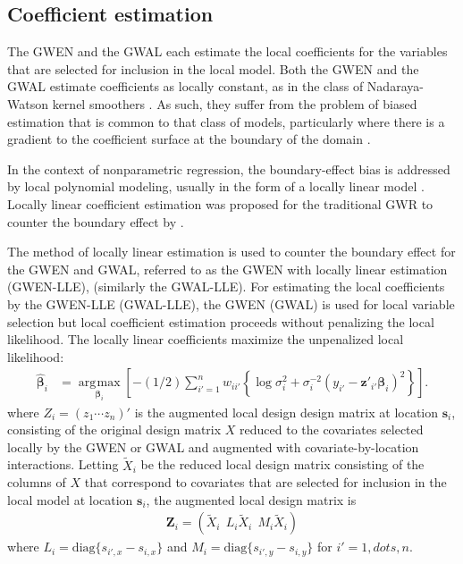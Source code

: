 \documentclass[authoryear, review, 11pt]{elsarticle}
\DeclareMathOperator*{\argmax}{\arg\!\max}
\begin{document}
	\subsection{Coefficient estimation}\label{section:LLE}
	The GWEN and the GWAL each estimate the local coefficients for the variables that are selected for inclusion in the local model. Both the GWEN and the GWAL estimate coefficients as locally constant, as in the class of Nadaraya-Watson kernel smoothers \citep{Hardle-1990}. As such, they suffer from the problem of biased estimation that is common to that class of models, particularly where there is a gradient to the coefficient surface at the boundary of the domain \citep{Hastie:1993b}.

    In the context of nonparametric regression, the boundary-effect bias is addressed by local polynomial modeling, usually in the form of a locally linear model \citep{Fan-1996}. Locally linear coefficient estimation was proposed for the traditional GWR to counter the boundary effect by \cite{Wang:2008b}.

    The method of locally linear estimation is used to counter the boundary effect for the GWEN and GWAL, referred to as the GWEN with locally linear estimation (GWEN-LLE), (similarly the GWAL-LLE). For estimating the local coefficients by the GWEN-LLE (GWAL-LLE), the GWEN (GWAL) is used for local variable selection but local coefficient estimation proceeds without penalizing the local likelihood. The locally linear coefficients maximize the unpenalized local likelihood:
	\begin{align} \label{eq:coefficients}
		\hat{\bm{\beta}}_i &= \argmax \limits_{\bm{\beta}_i} \left[-(1/2) \sum_{i'=1}^n w_{ii'} \left\{ \log{\sigma^2_i}  + \sigma^{-2}_i  \left(y_{i'} - \bm{z}'_{i'} \bm{\beta}_i \right)^2 \right\}\right].
	\end{align}
	where $Z_i  = \left(z_1 \cdots z_n\right)'$ is the augmented local design design matrix at location $\bm{s}_i$, consisting of the original design matrix $X$ reduced to the covariates selected locally by the GWEN or GWAL and augmented with covariate-by-location interactions. Letting $\tilde{X}_i$ be the reduced local design matrix consisting of the columns of $X$ that correspond to covariates that are selected for inclusion in the local model at location $\bm{s}_i$, the augmented local design matrix is
	\begin{align}
		\bm{Z}_i = \left( \tilde{X}_i  \:\: L_i \tilde{X}_i \:\: M_i \tilde{X}_i \right)
	\end{align}
	where $L_i = \text{diag}\{s_{i',x} - s_{i,x}\}$ and $M_i = \text{diag}\{s_{i',y} - s_{i,y}\}$ for $i' = 1, dots, n$.
	 
\end{document}
